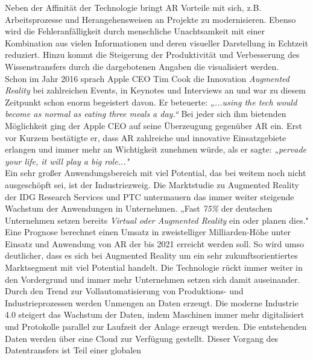 Neben der Affinität der Technologie bringt \acs{AR} Vorteile mit sich, z.B. Arbeitsprozesse und Herangehensweisen an Projekte zu 
modernisieren. Ebenso wird die Fehleranfälligkeit durch menschliche Unachtsamkeit mit einer Kombination aus vielen Informationen und 
deren visueller Darstellung in Echtzeit reduziert. Hinzu kommt die Steigerung der Produktivität und Verbesserung des Wissenstransfers 
durch die dargebotenen Angaben die visualisiert werden.
\\ 
\linebreak
Schon im Jahr 2016 sprach Apple CEO Tim Cook die Innovation \textit{Augmented Reality} bei zahlreichen Events, in Keynotes und Interviews 
an und war zu diesem Zeitpunkt schon enorm begeistert davon. Er beteuerte: \textit{„...using the tech would become as normal as eating three 
meals a day.“} \cite{timcook2016.2016o} Bei jeder sich ihm bietenden Möglichkeit ging der Apple CEO auf seine Überzeugung gegenüber \acl{AR} ein. 
Erst vor Kurzem bestätigte er, dass \acs{AR} zahlreiche und innovative Einsatzgebiete erlangen und immer mehr an Wichtigkeit zunehmen 
würde, als er sagte: \textit{„pervade your life, it will play a big role..."} \cite{timcook.2020j} 
\\ 
\linebreak
Ein sehr großer Anwendungsbereich mit viel Potential, das bei weitem noch nicht ausgeschöpft sei, ist der Industriezweig. Die 
Marktstudie zu Augmented Reality der IDG Research Services und PTC untermauern das immer weiter steigende Wachstum der Anwendungen in 
Unternehmen. „Fast \textit{75\%} der deutschen Unternehmen setzen bereits \textit{Virtual oder Augmented Reality} ein oder planen dies." 
\cite{studieptc.2020j} Eine Prognose berechnet einen Umsatz in zweistelliger Milliarden-Höhe unter Einsatz und Anwendung von \acs{AR} der 
bis 2021 erreicht werden soll. So wird umso deutlicher, dass es sich bei Augmented Reality um ein sehr zukunftsorientiertes Marktsegment 
mit viel Potential handelt. Die Technologie rückt immer weiter in den Vordergrund und immer mehr Unternehmen setzen sich damit auseinander.
\\ 
\linebreak
Durch den Trend zur Vollautomatisierung von Produktions- und Industrieprozessen werden Unmengen an Daten erzeugt. Die moderne Industrie 4.0 
steigert das Wachstum der Daten, indem Maschinen immer mehr digitalisiert und Protokolle parallel zur Laufzeit der Anlage erzeugt werden. 
Die entstehenden Daten werden über eine Cloud zur Verfügung gestellt. Dieser Vorgang des Datentransfers ist Teil einer globalen 
